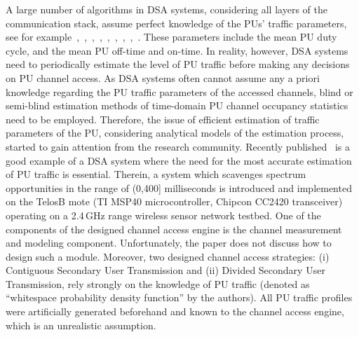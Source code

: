 \documentclass[11pt,draftclsnofoot,journal,onecolumn]{IEEEtran}
\begin{document}
A large number of algorithms in DSA systems, considering all layers of the communication stack, assume perfect knowledge of the PUs' traffic parameters, see for example~\cite[Sec. 2.1]{park_tmc_2011},~\cite[Sec. II-B]{gabran_tvt_2011},~\cite[Sec. II]{jiang_twc_2009},~\cite[Sec. III]{Chou_jsac_2007},~\cite[Sec. 3.1]{wang_tmc_2012},~\cite[Sec. 3.2]{wang_tmc_2011},~\cite[Sec. II]{wang_twc_2012},~\cite[Sec. II-A]{wang_tvt_2012},~\cite[Sec. III-A]{jung_ton_2012}. These parameters include the mean PU duty cycle, and the mean PU off-time and on-time. In reality, however, DSA systems need to periodically estimate the level of PU traffic before making any decisions on PU channel access. As DSA systems often cannot assume any a priori knowledge regarding the PU traffic parameters of the accessed channels, blind or semi-blind estimation methods of time-domain PU channel occupancy statistics need to be employed. Therefore, the issue of efficient estimation of traffic parameters of the PU, considering analytical models of the estimation process, started to gain attention from the research community. Recently published~\cite{plummer_tmc_2012} is a good example of a DSA system where the need for the most accurate estimation of PU traffic is essential. Therein, a system which scavenges spectrum opportunities in the range of (0,400] milliseconds is introduced and implemented on the TelosB mote (TI MSP40 microcontroller, Chipcon CC2420 transceiver) operating on a 2.4\,GHz range wireless sensor network testbed. One of the components of the designed channel access engine is the channel measurement and modeling component. Unfortunately, the paper does not discuss how to design such a module. Moreover, two designed channel access strategies: (i) Contiguous Secondary User Transmission and (ii) Divided Secondary User Transmission, rely strongly on the knowledge of PU traffic (denoted as ``whitespace probability density function'' by the authors). All PU traffic profiles were artificially generated beforehand and known to the channel access engine, which is an unrealistic assumption.
\end{document}
